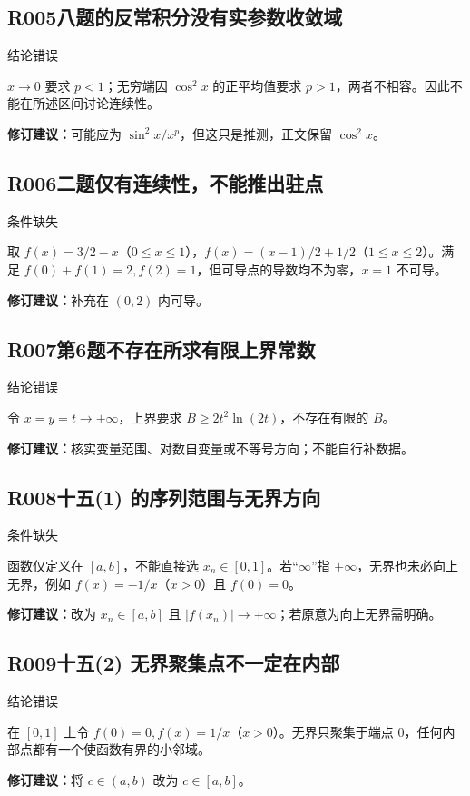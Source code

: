 \subsection*{R005\quad 八题的反常积分没有实参数收敛域}
\noindent{}\quad 结论错误\par
$x\to0$ 要求 $p<1$；无穷端因 $\cos^2x$ 的正平均值要求 $p>1$，两者不相容。因此不能在所述区间讨论连续性。
\par\textbf{修订建议：}可能应为 $\sin^2x/x^p$，但这只是推测，正文保留 $\cos^2x$。\par
{}
\subsection*{R006\quad 二题仅有连续性，不能推出驻点}
\noindent{}\quad 条件缺失\par
取 $f(x)=3/2-x$（$0\le x\le1$），$f(x)=(x-1)/2+1/2$（$1\le x\le2$）。满足 $f(0)+f(1)=2,f(2)=1$，但可导点的导数均不为零，$x=1$ 不可导。
\par\textbf{修订建议：}补充在 $(0,2)$ 内可导。\par
{}
\subsection*{R007\quad 第6题不存在所求有限上界常数}
\noindent{}\quad 结论错误\par
令 $x=y=t\to+\infty$，上界要求 $B\ge2t^2\ln(2t)$，不存在有限的 $B$。
\par\textbf{修订建议：}核实变量范围、对数自变量或不等号方向；不能自行补数据。\par
{}
\subsection*{R008\quad 十五(1) 的序列范围与无界方向}
\noindent{}\quad 条件缺失\par
函数仅定义在 $[a,b]$，不能直接选 $x_n\in[0,1]$。若“$\infty$”指 $+\infty$，无界也未必向上无界，例如 $f(x)=-1/x$（$x>0$）且 $f(0)=0$。
\par\textbf{修订建议：}改为 $x_n\in[a,b]$ 且 $|f(x_n)|\to+\infty$；若原意为向上无界需明确。\par
{}
\subsection*{R009\quad 十五(2) 无界聚集点不一定在内部}
\noindent{}\quad 结论错误\par
在 $[0,1]$ 上令 $f(0)=0,f(x)=1/x$（$x>0$）。无界只聚集于端点 $0$，任何内部点都有一个使函数有界的小邻域。
\par\textbf{修订建议：}将 $c\in(a,b)$ 改为 $c\in[a,b]$。\par
{}
